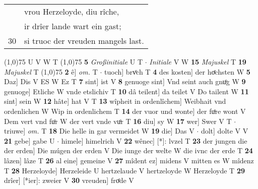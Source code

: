 \documentclass[8pt,a4paper,notitlepage]{article}
\begin{document}
\begin{table}[ht]
\begin{minipage}[t]{0.5\linewidth}
\begin{tabular}{rl}
 & vrou Herzeloyde, diu rîche,\\ 
 & ir drîer lande wart ein gast;\\ 
30 & si truoc der vreuden mangels last.\\ 
\end{tabular}
\scriptsize
\line(1,0){75} \newline
U V W T \newline
\line(1,0){75} \newline
\textbf{5} \textit{Großinitiale} U T   $\cdot$ \textit{Initiale} V W  \textbf{15} \textit{Majuskel} T  \textbf{19} \textit{Majuskel} T  \newline
\line(1,0){75} \newline
\textbf{2} ê] \textit{om.} T  $\cdot$ tuoch] brvͦch T \textbf{4} des kosten] der hoͤchsten W \textbf{5} Daz] Dis V ES W Ez T \textbf{7} sint] ist V \textbf{8} genuoge sint] Vnd seint auch gnuͦg W \textbf{9} genuoge] Etliche W vnde etslichiv T \textbf{10} dâ teilent] da teilet V Do tailent W \textbf{11} sint] sein W \textbf{12} hâte] hat V T \textbf{13} wîpheit in ordenlîchem] Weibhait vnd ordenlichen W Wip in ordenlichem T \textbf{14} der vuor und wonte] der fuͦre wont V Dem vert vnd fuͦr W der vert vnde vuͦr T \textbf{16} diu] sy W \textbf{17} wer] Swer V T  $\cdot$ triuwe] \textit{om.} T \textbf{18} Die helle in gar vermeidet W \textbf{19} die] Das V  $\cdot$ dolt] dolte V V \textbf{21} gebe] gabe U  $\cdot$ himele] himelrich V \textbf{22} wênec] [*]: lvzel T \textbf{23} der jungen die der erden] Die múgen der erden V Die iunge der welte W die ivnc der erde T \textbf{24} lâzen] lâze T \textbf{26} al eine] gemeine V \textbf{27} mîdent ez] midens V mitten es W mîdenz T \textbf{28} Herzeloyde] Herzeleide U hertzelaude V hertzeloyde W Herzeloyde T \textbf{29} drîer] [*ier]: zweier V \textbf{30} vreuden] froͤde V \newline
\end{minipage}
\end{table}
\end{document}
